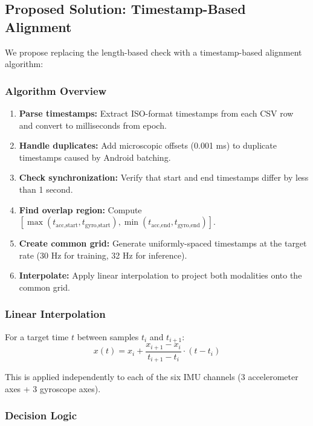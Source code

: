 \subsection{Proposed Solution: Timestamp-Based Alignment}

We propose replacing the length-based check with a timestamp-based alignment algorithm:

\subsubsection{Algorithm Overview}

\begin{enumerate}
    \item \textbf{Parse timestamps:} Extract ISO-format timestamps from each CSV row and convert to milliseconds from epoch.
    \item \textbf{Handle duplicates:} Add microscopic offsets (0.001 ms) to duplicate timestamps caused by Android batching.
    \item \textbf{Check synchronization:} Verify that start and end timestamps differ by less than 1 second.
    \item \textbf{Find overlap region:} Compute $[\max(t_{\text{acc,start}}, t_{\text{gyro,start}}), \min(t_{\text{acc,end}}, t_{\text{gyro,end}})]$.
    \item \textbf{Create common grid:} Generate uniformly-spaced timestamps at the target rate (30 Hz for training, 32 Hz for inference).
    \item \textbf{Interpolate:} Apply linear interpolation to project both modalities onto the common grid.
\end{enumerate}

\subsubsection{Linear Interpolation}

For a target time $t$ between samples $t_i$ and $t_{i+1}$:
\begin{equation}
    x(t) = x_i + \frac{x_{i+1} - x_i}{t_{i+1} - t_i} \cdot (t - t_i)
\end{equation}

This is applied independently to each of the six IMU channels (3 accelerometer axes + 3 gyroscope axes).

\subsubsection{Decision Logic}

